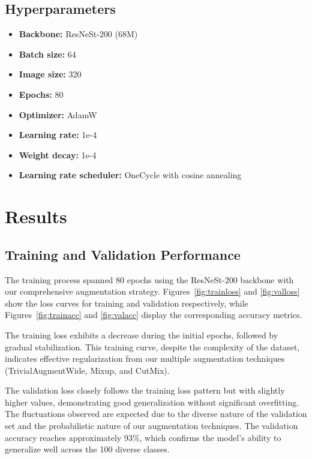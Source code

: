 \documentclass[twocolumn,a4paper]{article}
\begin{document}
\subsection{Hyperparameters}
\begin{itemize}
\item \textbf{Backbone:} ResNeSt-200 (68M)
\item \textbf{Batch size:} 64
\item \textbf{Image size:} 320
\item \textbf{Epochs:} 80
\item \textbf{Optimizer:} AdamW
\item \textbf{Learning rate:} 1e-4
\item \textbf{Weight decay:} 1e-4
\item \textbf{Learning rate scheduler:} OneCycle with cosine annealing
\end{itemize}

\section{Results}

\subsection{Training and Validation Performance}

The training process spanned 80 epochs using the ResNeSt-200 backbone with our comprehensive augmentation strategy. Figures~\ref{fig:trainloss} and \ref{fig:valloss} show the loss curves for training and validation respectively, while Figures~\ref{fig:trainacc} and \ref{fig:valacc} display the corresponding accuracy metrics.

The training loss exhibits a decrease during the initial epochs, followed by gradual stabilization. This training curve, despite the complexity of the dataset, indicates effective regularization from our multiple augmentation techniques (TrivialAugmentWide, Mixup, and CutMix).

The validation loss closely follows the training loss pattern but with slightly higher values, demonstrating good generalization without significant overfitting. The fluctuations observed are expected due to the diverse nature of the validation set and the probabilistic nature of our augmentation techniques. The validation accuracy reaches approximately 93\%, which confirms the model's ability to generalize well across the 100 diverse classes.
\end{document}
